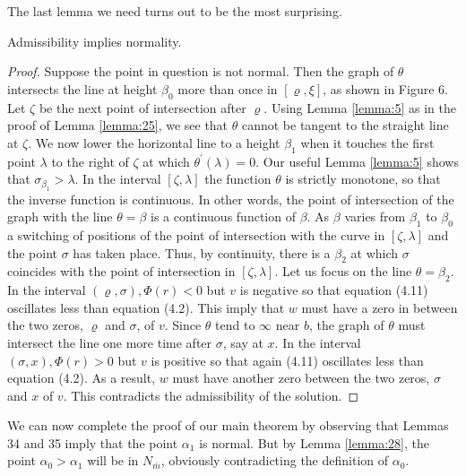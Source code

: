 The last lemma we need turns out to be the most surprising.

\begin{lemma}\label{lemma:35}
  Admissibility implies normality.
\end{lemma}

\begin{proof}
  Suppose the point in question is not normal.
  Then the graph of $\theta$ intersects the line at height $\beta_0$ more than once
  in $[\varrho, \xi]$, as shown in Figure 6.
  Let $\zeta$ be the next point of intersection after $\varrho$.
  Using Lemma \ref{lemma:5} as in the proof of Lemma \ref{lemma:25},
  we see that $\theta$ cannot be tangent to the straight line at $\zeta$.
  We now lower the horizontal line to a height $\beta_1$ when it touches the first point 
  $\lambda$ to the right of $\zeta$ at which $\theta^{\prime}(\lambda)=0$.
  Our useful Lemma \ref{lemma:5} shows that $\sigma_{\beta_1}>\lambda$. In the interval $[\zeta,\lambda]$ 
  the function $\theta$ is strictly monotone, so that the inverse function is continuous.
  In other words, the point of intersection of the graph with the line $\theta=\beta$ is a 
  continuous function of $\beta$. As $\beta$ varies from $\beta_1$ to $\beta_0$ a switching of 
  positions of the point of intersection with the curve in $[\zeta, \lambda]$ and the point 
  $\sigma$ has taken place. Thus, by continuity, there is a $\beta_2$ at which $\sigma$ 
  coincides with the point of intersection in $[\zeta, \lambda]$. Let us focus on the line 
  $\theta=\beta_2$. In the interval $(\varrho, \sigma), \Phi(r)<0$ but $v$ is negative so that 
  equation (4.11) oscillates less than equation (4.2). This imply that $w$ must have a zero in 
  between the two zeros, $\varrho$ and $\sigma$, of $v$. Since $\theta$ tend to $\infty$ near 
  $b$, the graph of $\theta$ must intersect the line one more time after $\sigma$, say at $x$. 
  In the interval $(\sigma, x), \Phi(r)>0$ but $v$ is positive so that again (4.11) oscillates 
  less than equation (4.2). As a result, $w$ must have another zero between the two zeros, 
  $\sigma$ and $x$ of $v$. This contradicts the admissibility of the solution.
\end{proof}


We can now complete the proof of our main theorem by observing that Lemmas 34 and 35
imply that the point $\alpha_1$ is normal. But by Lemma \ref{lemma:28}, the point $\alpha_0>\alpha_1$
will be in $N_{\bar{m}}$, obviously contradicting the definition of $\alpha_0$.